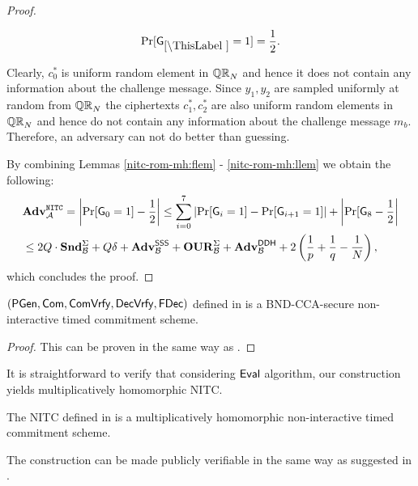 \begin{proof}
\begin{lemma}\label{nitc-rom-mh:llem}
\[
\Pr[\games_\thisgame = 1] = \half.
\]
\end{lemma}

Clearly, $c_0^*$ is uniform random element in $\mathbb{QR}_N$ and hence it does not contain any information about the challenge message. Since $y_1, y_2$ are sampled uniformly at random from $\mathbb{QR}_N$ the ciphertexts $c_1^*, c_2^*$ are also uniform random elements in $\mathbb{QR}_N$ and hence do not contain any information about the challenge message $m_b$. Therefore, an adversary can not do better than guessing.

By combining Lemmas \ref{nitc-rom-mh:flem} - \ref{nitc-rom-mh:llem} we obtain the following:
\begin{align*}
&\mathbf{Adv}^{\mathtt{NITC}}_{\mathcal{A}} = \left| \Pr[\mathsf{G}_0 = 1] - \frac{1}{2} \right| \leq \sum_{i=0}^7 \left|\Pr[\mathsf{G}_i = 1] - \Pr[\mathsf{G}_{i+1} = 1] \right| + \left|\Pr[\mathsf{G}_{8}- \frac{1}{2}\right| \\
 &\leq 2Q \cdot \mathbf{Snd}^\Sigma_{\mathcal{B}} + Q\delta + \mathbf{Adv}^{\mathsf{SSS}}_{\mathcal{B}} + \mathbf{OUR}^\Sigma_{\mathcal{B}} + \mathbf{Adv}^{\mathsf{DDH}}_{\mathcal{B}} + 2 \left( \frac{1}{p}+\frac{1}{q}-\frac{1}{N} \right),
\end{align*}
which concludes the proof.
\end{proof}

\begin{theorem}
$(\mathsf{PGen}, \mathsf{Com}, \mathsf{ComVrfy}, \mathsf{DecVrfy}, \mathsf{FDec})$ defined in  is a BND-CCA-secure non-interactive timed commitment scheme. 
\end{theorem}

\begin{proof}
This can be proven in the same way as .
\end{proof}

It is straightforward to verify that considering $\mathsf{Eval}$ algorithm, our construction yields multiplicatively homomorphic NITC. 
\begin{theorem}\label{hom-mh-rom}
The NITC \mathlist{(\pgen, \com, \cvrfy, \dvrfy, \fdecom, \fdvrfy, \eval)} defined in  is a multiplicatively homomorphic non-interactive timed commitment scheme.
\end{theorem}


\begin{remark}
The construction can be made publicly verifiable in the same way as suggested in . 
 \end{remark}

